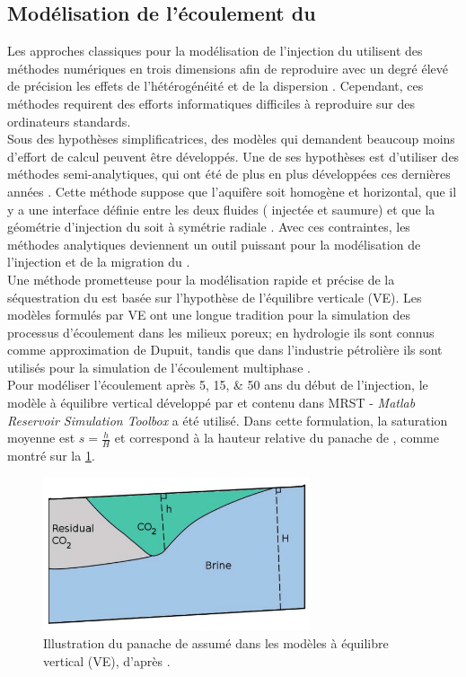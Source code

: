 \subsection{Modélisation de l'écoulement du \texorpdfstring{}{CO2}}
Les approches classiques pour la modélisation de l'injection du  utilisent 
des méthodes numériques en trois dimensions afin de reproduire avec un degré élevé de précision les effets de l'hétérogénéité et de la dispersion \citep{White1997,Pruess1999,Pruess2004,Schlumberger2007}. Cependant, ces méthodes requirent des efforts informatiques difficiles à reproduire sur des ordinateurs standards.\\
Sous des hypothèses simplificatrices, des modèles qui demandent beaucoup moins d'effort de calcul peuvent être développés. Une de ses hypothèses est d'utiliser des méthodes semi-analytiques, qui ont été de plus en plus développées ces dernières années \citep{Nordbotten2004,Nordbotten2005a,Nordbotten2005,Nordbotten2009}. Cette méthode suppose que l’aquifère soit homogène et horizontal, que il y a une interface définie entre les deux fluides ( injectée et saumure) et que la géométrie d'injection du  soit à symétrie radiale \citep{Gasda2009}. Avec ces contraintes, les méthodes analytiques deviennent un outil puissant pour la modélisation de l'injection et de la migration du .\\
Une méthode prometteuse pour la modélisation rapide et précise de la séquestration du  est basée sur l'hypothèse de l'équilibre verticale (VE). Les modèles formulés par VE ont une longue tradition pour la simulation des processus d'écoulement dans les milieux poreux; en hydrologie ils sont connus comme approximation de Dupuit, tandis que dans l'industrie pétrolière ils sont utilisés pour la simulation de l’écoulement multiphase \citep{Martin1958,Coats1967,Martin1968}.\\
Pour modéliser l'écoulement après \numlist{5;15;50} ans du début de l'injection, le modèle à équilibre vertical développé par \citep{Ligaarden2010} et contenu dans MRST - \emph{Matlab Reservoir Simulation Toolbox} \citep{Lie2012} a été utilisé. Dans cette formulation, la saturation moyenne est $s=\frac{h}{H}$ et correspond à la hauteur relative du panache de , comme montré sur la \cref{fig:VE}.
\begin{figure}[!ht]
\centering
\includegraphics[width=0.7\textwidth]{fig/VE.png}
\caption{Illustration du panache de  assumé dans les modèles à équilibre vertical (VE), d'après \citet{Ligaarden2010}.}
\label{fig:VE}
\end{figure}
